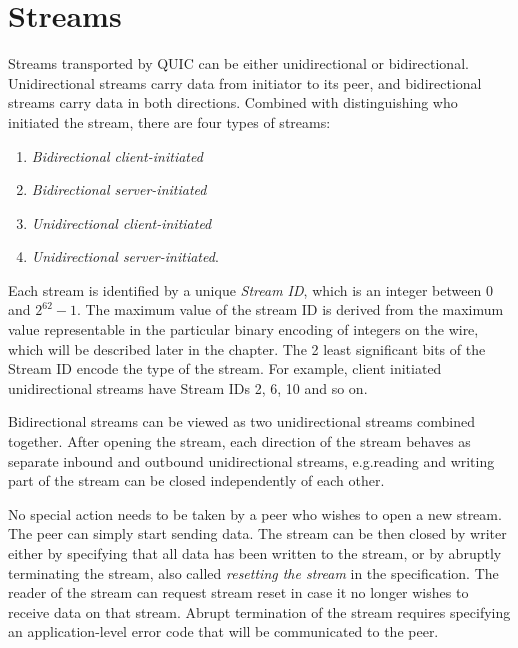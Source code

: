 \section{Streams}

Streams transported by QUIC can be either unidirectional or bidirectional. Unidirectional streams
carry data from initiator to its peer, and bidirectional streams carry data in both directions.
Combined with distinguishing who initiated the stream, there are four types of streams:


\begin{enumerate}

  \item \textit{Bidirectional client-initiated}
  \item \textit{Bidirectional server-initiated}
  \item \textit{Unidirectional client-initiated}
  \item \textit{Unidirectional server-initiated}.

\end{enumerate}

Each stream is identified by a unique \textit{Stream ID}, which is an integer between 0 and
$2^{62}-1$.   The maximum value of the stream ID is derived from the maximum value representable in
the particular binary encoding of integers on the wire, which will be described later in the
chapter.  The 2 least significant bits of the Stream ID encode the type of the stream. For example,
client initiated unidirectional streams have Stream IDs 2, 6, 10 and so on.

Bidirectional streams can be viewed as two unidirectional streams combined together. After opening
the stream, each direction of the stream behaves as separate inbound and outbound unidirectional
streams, e.g.\@the reading and writing part of the stream can be closed independently of each other.

No special action needs to be taken by a peer who wishes to open a new stream. The peer can simply
start sending data. The stream can be then closed by writer either by specifying that all data has
been written to the stream, or by abruptly terminating the stream, also called \textit{resetting the
stream} in the specification. The reader of the stream can request stream reset in case it no longer
wishes to receive data on that stream. Abrupt termination of the stream requires specifying an
application-level error code that will be communicated to the peer.

